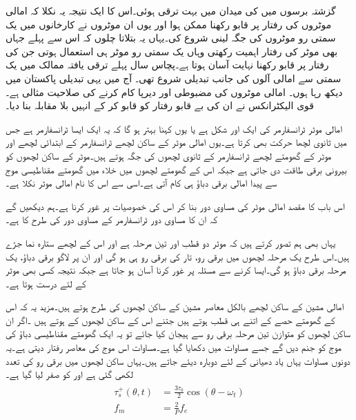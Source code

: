 گزشتہ برسوں میں  کی میدان میں بہت ترقی ہوئی۔اس کا ایک نتیجہ یہ نکلا کہ امالی موٹروں کی رفتار پر قابو رکھنا ممکن ہوا اور یوں ان موٹروں نے کارخانوں میں یک سمتی رو موٹروں کی جگہ لینی شروع کی۔یہاں یہ بتلاتا چلوں کہ اس سے پہلے جہاں بھی موٹر کی رفتار اہمیت رکھتی وہاں یک سمتی رو موٹر ہی استعمال ہوتی جن کی رفتار پر قابو رکھنا نہایت آسان ہوتا ہے۔پچاس سال پہلے ترقی یافتہ ممالک میں یک سمتی سے امالی آلوں کی جانب تبدیلی شروع تھی۔ آج میں یہی تبدیلی پاکستان میں دیکھ رہا ہوں۔ امالی موٹروں کی مضبوطی اور دیرپا کام کرنے کی صلاحیت مثالی ہے۔ قوی الیکٹرانکس نے ان کی بے قابو رفتار کو قابو کر کے انہیں بلا مقابلہ بنا دیا۔

امالی موٹر ٹرانسفارمر کی ایک اور شکل ہے یا یوں کہنا بہتر ہو گا کہ یہ ایک ایسا ٹرانسفارمر ہے جس میں ثانوی لچھا حرکت بھی کرتا ہے۔یوں امالی موٹر کے ساکن لچھے ٹرانسفارمر کے ابتدائی لچھے اور موٹر کے گھومتے لچھے ٹرانسفارمر کے ثانوی لچھوں کی جگہ ہوتے ہیں۔موٹر کے ساکن لچھوں کو بیرونی برقی طاقت دی جاتی ہے جبکہ اس کے گھومتے لچھوں میں خلاء میں گھومتے مقناطیسی موج سے پیدا امالی برقی دباؤ ہی کام آتی ہے۔اسی سے اس کا نام امالی موٹر نکلا ہے۔

 اس باب کا مقصد امالی موٹر کی مساوی دور بنا کر اس کی خصوصیات پر غور کرنا ہے۔ہم دیکھیں گے کہ ان کا مساوی دور ٹرانسفارمر کے مساوی دور کی طرح کا ہے۔

یہاں بھی ہم تصور کرتے ہیں کہ موٹر دو قطب اور تین مرحلہ ہے اور اس کے لچھے ستارہ نما جڑے ہیں۔اس طرح یک مرحلہ لچھوں میں برقی رو، تار کی برقی رو ہی ہو گی اور ان پر لاگو برقی دباؤ، یک مرحلہ برقی دباؤ ہو گی۔ایسا کرنے سے مسئلہ پر غور کرنا آسان ہو جاتا ہے جبکہ نتیجہ کسی بھی موٹر کے لئے درست ہوتا ہے۔

امالی مشین کے ساکن لچھے بالکل معاصر مشین کے ساکن لچھوں کی طرح ہوتے ہیں۔مزید یہ کہ اس کے گھومتے حصے کے اتنے ہی قطب ہوتے ہیں جتنے اس کے ساکن لچھوں کے ہوتے ہیں ۔اگر ان ساکن لچھوں کو متوازن تین مرحلہ برقی رو سے ہیجان کیا جائے تو یہ ایک گھومتے مقناطیسی دباؤ کی موج کو جنم دیں گے جسے مساوات   میں دکھایا گیا ہے۔مساوات   اس موج کی معاصر رفتار دیتی ہے۔یہ دونوں مساوات یہاں یاد دھیانی کے لئے دوبارہ دیئے جاتے ہیں۔یہاں ساکن لچھوں میں برقی رو کی تعدد  لکھی گئی ہے اور  کو صفر لیا گیا ہے۔
\begin{gather}
\begin{aligned}\label{مساوات_امالی_گھومتا_مقناطیسی_دباؤ_الف}
\tau_s^+ (\theta,t)&=\frac{3 \tau_0}{2} \cos (\theta-\omega_ t)\\
f_m&=\frac{2}{P} f_e
\end{aligned}
\end{gather}


